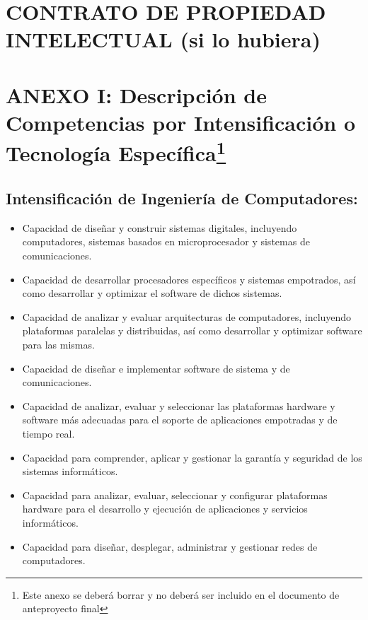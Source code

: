 \documentclass{pre-tfg}
\begin{document}

\singlespacing


\section{CONTRATO DE PROPIEDAD INTELECTUAL (si lo hubiera)}

\newpage
\section*{ANEXO I: Descripción de Competencias por Intensificación o Tecnología
Específica\footnote{Este anexo se deberá borrar y no deberá ser incluido en el documento de anteproyecto final}}


\subsection*{Intensificación de Ingeniería de Computadores:}

\begin{itemize}
\item Capacidad de diseñar y construir sistemas digitales, incluyendo computadores,
  sistemas basados en microprocesador y sistemas de comunicaciones.
\item Capacidad de desarrollar procesadores específicos y sistemas empotrados, así como
  desarrollar y optimizar el software de dichos sistemas.
\item Capacidad de analizar y evaluar arquitecturas de computadores, incluyendo
  plataformas paralelas y distribuidas, así como desarrollar y optimizar software para las
  mismas.
\item Capacidad de diseñar e implementar software de sistema y de comunicaciones.
\item Capacidad de analizar, evaluar y seleccionar las plataformas hardware y software más
  adecuadas para el soporte de aplicaciones empotradas y de tiempo real.
\item Capacidad para comprender, aplicar y gestionar la garantía y seguridad de los sistemas informáticos.
\item Capacidad para analizar, evaluar, seleccionar y configurar plataformas hardware para
  el desarrollo y ejecución de aplicaciones y servicios informáticos.
\item Capacidad para diseñar, desplegar, administrar y gestionar redes de computadores.
\end{itemize}
\end{document}
